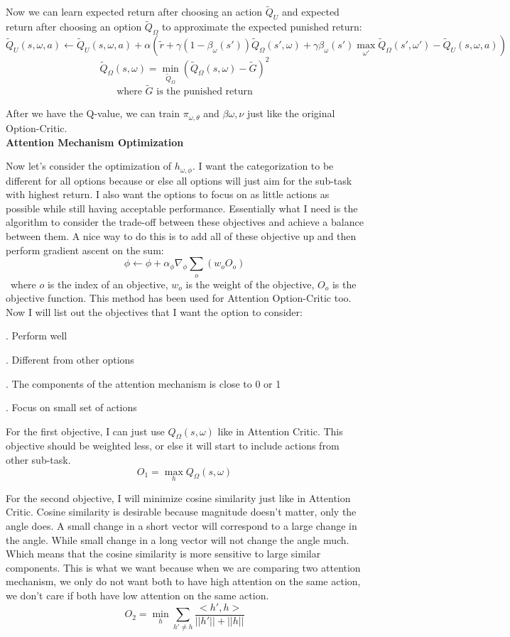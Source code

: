 \documentclass{article}
\begin{document}
	\quad Now we can learn expected return after choosing an action $\widetilde{Q}_U$ and expected return after choosing an option $\widetilde{Q}_\Omega$ to approximate the expected punished return:$$\widetilde{Q}_U(s,\omega,a) \leftarrow \widetilde{Q}_U(s,\omega,a) + \alpha(\widetilde{r} + \gamma(1-\beta_\omega(s'))\widetilde{Q}_\Omega(s',\omega)+\gamma \beta_\omega(s')\max_{\omega'} \widetilde{Q}_\Omega(s',\omega') - \widetilde{Q}_U(s,\omega,a))$$ $$\widetilde{Q}_\Omega(s,\omega)=\min_{\widetilde{Q}_\Omega} (\widetilde{Q}_\Omega(s,\omega)-\widetilde{G})^2$$ $$\textrm{where } \widetilde{G} \textrm{ is the punished return}$$
	
	\quad After we have the Q-value, we can train $\pi_{\omega,\theta}$ and $\beta{\omega, \nu}$ just like the original Option-Critic.\vspace{0.2in}\\
	{\bfseries Attention Mechanism Optimization}\vspace{0.05in}
	
	\quad Now let's consider the optimization of $h_{\omega,\phi}$. I want the categorization to be different for all options because or else all options will just aim for the sub-task with highest return. I also want the options to focus on as little actions as possible while still having acceptable performance. Essentially what I need is the algorithm to consider the trade-off between these objectives and achieve a balance between them. A nice way to do this is to add all of these objective up and then perform gradient ascent on the sum: $$\phi \leftarrow \phi + \alpha_\phi \nabla_\phi \sum_{o} (w_o O_o)$$ \qquad \ where $o$ is the index of an objective, $w_o$ is the weight of the objective, $O_o$ is the objective function.
	\quad This method has been used for Attention Option-Critic too. Now I will list out the objectives that I want the option to consider: 
	
	. Perform well
	
	. Different from other options
	
	. The components of the attention mechanism is close to 0 or 1
	
	. Focus on small set of actions
	
	\quad For the first objective, I can just use $Q_\Omega(s,\omega)$ like in Attention Critic. This objective should be weighted less, or else it will start to include actions from other sub-task. $$O_1=\max_h Q_\Omega(s,\omega)$$
	
	\quad For the second objective, I will minimize cosine similarity just like in Attention Critic. Cosine similarity is desirable because magnitude doesn't matter, only the angle does. A small change in a short vector will correspond to a large change in the angle. While small change in a long vector will not change the angle much. Which means that the cosine similarity is more sensitive to large similar components. This is what we want because when we are comparing two attention mechanism, we only do not want both to have high attention on the same action, we don't care if both have low attention on the same action.$$O_2 = \min_h \sum_{h' \neq h} \frac{<h', h>}{||h'||+||h||}$$
	
\end{document}
